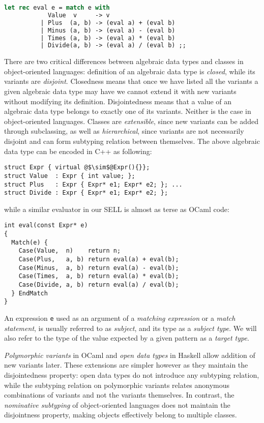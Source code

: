 \documentclass{llncs}
\makeatletter
\DeclareRobustCommand{\code}[1]{{\lstinline[keepspaces,breaklines=false,escapechar=@]{#1}}}
\makeatother
\begin{document}
\begin{lstlisting}[language=Caml,keepspaces,columns=flexible]
let rec eval e = match e with 
            Value  v     -> v 
          | Plus  (a, b) -> (eval a) + (eval b) 
          | Minus (a, b) -> (eval a) - (eval b)
          | Times (a, b) -> (eval a) * (eval b) 
          | Divide(a, b) -> (eval a) / (eval b) ;;
\end{lstlisting}

\noindent
There are two critical differences between algebraic data types and classes in 
object-oriented languages: definition of an algebraic data type is \emph{closed}, 
while its variants are \emph{disjoint}. Closedness means that once we have listed 
all the variants a given algebraic data type may have we cannot extend it with 
new variants without modifying its definition. Disjointedness means that a value 
of an algebraic data type belongs to exactly one of its variants. Neither is 
the case in object-oriented languages. Classes are \emph{extensible},
since new variants can be added through subclassing, as well as 
\emph{hierarchical}, since variants are not necessarily disjoint and can form 
subtyping relation between themselves. The above algebraic data type can be 
encoded in C++ as following:

\begin{lstlisting}[columns=flexible]
struct Expr { virtual @$\sim$@Expr(){}};
struct Value  : Expr { int value; };
struct Plus   : Expr { Expr* e1; Expr* e2; }; ...
struct Divide : Expr { Expr* e1; Expr* e2; };
\end{lstlisting}

\noindent
while a similar evaluator in our SELL is almost as terse as OCaml code:

\begin{lstlisting}[columns=flexible]
int eval(const Expr* e)
{
  Match(e) {
    Case(Value,  n)    return n;
    Case(Plus,   a, b) return eval(a) + eval(b); 
    Case(Minus,  a, b) return eval(a) - eval(b);
    Case(Times,  a, b) return eval(a) * eval(b); 
    Case(Divide, a, b) return eval(a) / eval(b);
  } EndMatch
}
\end{lstlisting}

\noindent
An expression \code{e} used as an argument of a \emph{matching expression} or a 
\emph{match statement}, is usually referred to as \emph{subject}, and its type 
as a \emph{subject type}. We will also refer to the type of the value expected 
by a given pattern as a \emph{target type}.

\emph{Polymorphic variants} in OCaml\cite{garrigue-98} and \emph{open data 
types} in Haskell\cite{LohHinze2006} allow addition of new variants later. 
These extensions are simpler however as they maintain the 
disjointedness property: open data types do not introduce any subtyping relation, 
while the subtyping relation on polymorphic variants relates anonymous 
combinations of variants and not the variants themselves. In contrast, 
the \emph{nominative subtyping} of object-oriented languages does not maintain 
the disjointness property, making objects effectively belong to multiple classes. 
\end{document}
